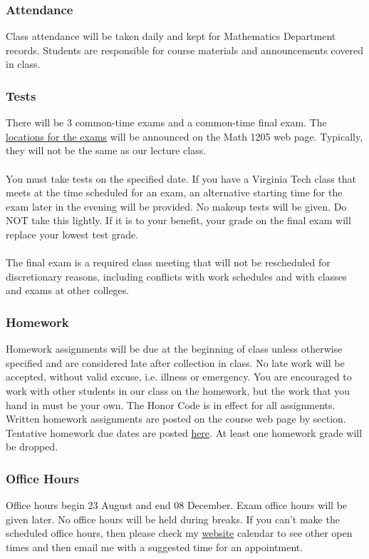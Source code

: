 \documentclass{article}
\begin{document}
		\subsubsection*{Attendance} 
			Class attendance will be taken daily and kept for Mathematics
			Department records. Students are responsible for course materials and
			announcements covered in class.

		\subsubsection*{Tests} 
			There will be 3 common-time exams and a common-time final exam. The
			\href{http://www.emporium.vt.edu/math1205/resources/testinfo}{locations
			for the exams} will be announced on the Math 1205 web page.
			Typically, they will not be the same as our lecture class.\\\\ You
			must take tests on the specified date. If you have a Virginia Tech class
			that meets at the time scheduled for an exam, an alternative starting
			time for the exam later in the evening will be provided.  No makeup
			tests will be given.  Do NOT take this lightly. If it is to your
			benefit, your grade on the final exam will replace your lowest test
			grade. \\ 
			\\ 
			The final exam is a required class meeting that will not be rescheduled for
			discretionary reasons, including conflicts with work schedules and with classes
			and exams at other colleges. 
				
		\subsubsection*{Homework }
      Homework assignments will be due at the beginning of class unless
			otherwise specified and are considered late after collection in class. No
			late work will be accepted, without valid excuse, i.e. illness or
			emergency. You are encouraged to work with other students in our class on
			the homework, but the work that you hand in must be your own. The Honor
			Code is in effect for all assignments. Written homework assignments are
			posted on the course web page by section. Tentative homework due dates are
			posted \href{http://www.math.vt.edu/people/erichlf/1205HWF10.html}{here}.
			At least one homework grade will be dropped. 
      
		\subsubsection*{Office Hours} 
			Office hours begin 23 August and end 08 December. Exam office hours
			will be given later. No office hours will be held during breaks.
			If you can't make the scheduled office hours, then please check my
			\href{http://www.math.vt.edu/people/erichlf/}{website} calendar to see
			other open times and then email me with a suggested time for an
			appointment. 
		  
\end{document}
